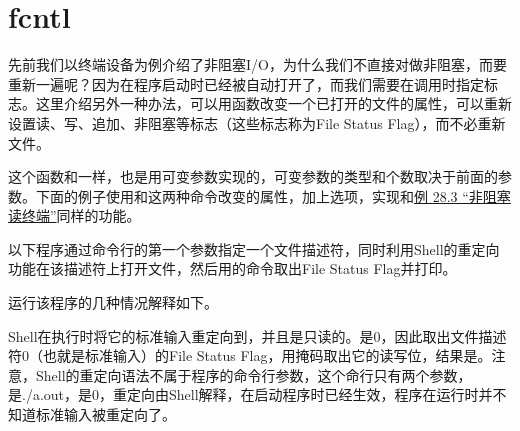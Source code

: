 \section{fcntl}
%
先前我们以终端设备为例介绍了非阻塞I/\BookSplit{}O，为什么我们不直接对做非阻塞，而要重新一遍呢？因为在程序启动时已经被自动打开了，而我们需要在调用时指定标志。这里介绍另外一种办法，可以用函数改变一个已打开的文件的属性，可以重新设置读、写、追加、非阻塞等标志（这些标志称为File Status Flag），而不必重新文件。




这个函数和一样，也是用可变参数实现的，可变参数的类型和个数取决于前面的参数。下面的例子使用和这两种命令改变的属性，加上选项，实现和\hyperlink{db.ch28s04.id2852714}{例 28.\BookSplit{}3 “非阻塞读终端”}同样的功能。





以下程序通过命令行的第一个参数指定一个文件描述符，同时利用Shell的重定向功能在该描述符上打开文件，然后用的命令取出File Status Flag并打印。




运行该程序的几种情况解释如下。




Shell在执行时将它的标准输入重定向到，并且是只读的。是0，因此取出文件描述符0（也就是标准输入）的File Status Flag，用掩码取出它的读写位，结果是。注意，Shell的重定向语法不属于程序的命令行参数，这个命行只有两个参数，是\BookQuoteChar{}./a.\BookSplit{}out\BookQuoteChar{}，是\BookQuoteChar{}0\BookQuoteChar{}，重定向由Shell解释，在启动程序时已经生效，程序在运行时并不知道标准输入被重定向了。


